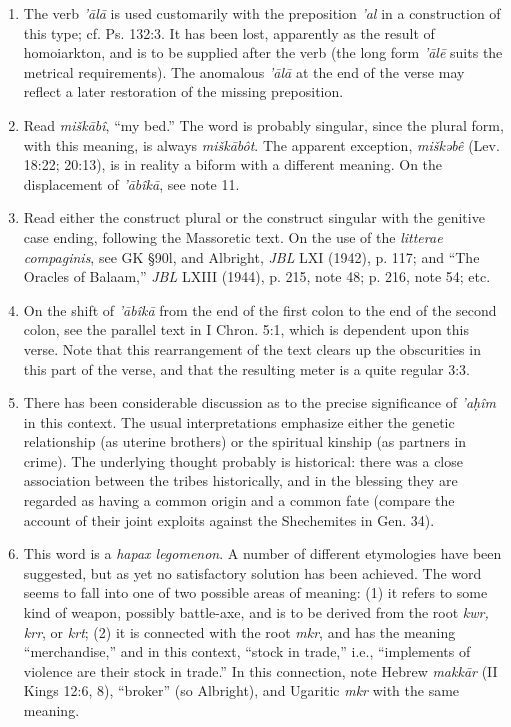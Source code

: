 \begin{enumerate}
\item
The verb \emph{'ālā} is used customarily with the preposition \emph{'al} in a
construction of this type; cf. Ps. 132:3. It has been lost, apparently as the
result of homoiarkton, and is to be supplied after the verb (the long form
\emph{'ālē} suits the metrical requirements). The anomalous \emph{'ālā} at the
end of the verse may reflect a later restoration of the missing preposition.

\item
Read \emph{miškābî}, ``my bed.'' The word is probably singular, since the
plural form, with this meaning, is always \emph{miškābôt}. The apparent
exception, \emph{miškəbê} (Lev. 18:22; 20:13), is in reality a biform with a
different meaning. On the displacement of \emph{'ābîkā}, see note 11.

\item
Read either the construct plural or the construct singular with the genitive
case ending, following the Massoretic text. On the use of the \emph{litterae
compaginis}, see GK §90l, and Albright, \emph{JBL} LXI (1942), p. 117; and
``The Oracles of Balaam,'' \emph{JBL} LXIII (1944), p. 215, note 48; p. 216,
note 54; etc.

\item
On the shift of \emph{'ābîkā} from the end of the first colon to the end of
the second colon, see the parallel text in I Chron. 5:1, which is dependent
upon this verse. Note that this rearrangement of the text clears up the
obscurities in this part of the verse, and that the resulting meter is a quite
regular 3:3.

\item
There has been considerable discussion as to the precise significance of
\emph{'aḥîm} in this context. The usual interpretations emphasize either the
genetic relationship (as uterine brothers) or the spiritual kinship (as
partners in crime). The underlying thought probably is historical: there was a
close association between the tribes historically, and in the blessing they
are regarded as having a common origin and a common fate (compare the account
of their joint exploits against the Shechemites in Gen. 34).

\item
This word is a \emph{hapax legomenon}. A number of different etymologies have
been suggested, but as yet no satisfactory solution has been achieved. The
word seems to fall into one of two possible areas of meaning: (1) it refers to
some kind of weapon, possibly battle-axe, and is to be derived from the root
\emph{kwr, krr}, or \emph{krt}; (2) it is connected with the root \emph{mkr},
and has the meaning ``merchandise,'' and in this context, ``stock in trade,''
i.e., ``implements of violence are their stock in trade.'' In this connection,
note Hebrew \emph{makkār} (II Kings 12:6, 8), ``broker'' (so Albright), and
Ugaritic \emph{mkr} with the same meaning.


\end{enumerate}
